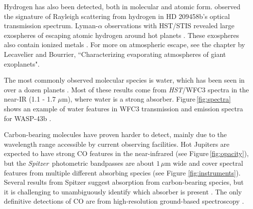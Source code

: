 \documentclass[graybox,natbib,nosecnum]{svmult}
\newcommand{\project}[1]{\textsl{#1}}
\newcommand{\HST}{\project{HST}}
\newcommand{\Spitzer}{\project{Spitzer}}
\begin{document}
Hydrogen has also been detected, both in molecular and atomic form. \cite{lecavelier08} observed the signature of Rayleigh scattering from hydrogen in HD 209458b's optical transmission spectrum.  Lyman-$\alpha$ observations with HST/STIS revealed  large exospheres of escaping atomic hydrogen around hot planets \citep[e.g.][]{vidal-madjar03, ehrenreich15}.  These exospheres also contain ionized metals \citep[e.g., OI, CII;][]{vidal-madjar04}. For more on atmospheric escape, see the chapter by Lecavelier and Bourrier, ``Characterizing evaporating atmospheres of giant exoplanets".

The most commonly observed molecular species is water, which has been seen in over a dozen planets \citep[e.g.][]{deming13, huitson13, birkby13, mccullough14, fraine14, kreidberg14b, kreidberg15b, line16, evans16, stevenson16b}. Most of these results come from \HST/WFC3 spectra in the near-IR (1.1 - 1.7 $\mu$m), where water is a strong absorber.  Figure\,\ref{fig:spectra} shows an example of water features in WFC3 transmission and emission spectra for WASP-43b \citep{kreidberg14b}.  %

Carbon-bearing molecules have proven harder to detect, mainly due to the wavelength range accessible by current observing facilities. Hot Jupiters are expected to have strong CO features in the near-infrared (see Figure\,\ref{fig:opacity}), but the \Spitzer\ photometric bandpasses are about $1\,\mu$m wide and cover spectral features from multiple different absorbing species (see Figure \ref{fig:instruments}). Several results from Spitzer suggest absorption from carbon-bearing species, but it is challenging to unambiguously identify which absorber is present \citep[e.g.][]{desert09, stevenson10, madhusudhan11, morley17}.  The only definitive detections of CO are from high-resolution ground-based spectroscopy \citep{dekok13,brogi14}.  
\end{document}

